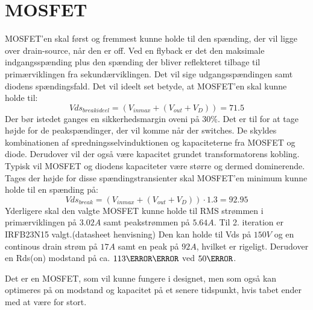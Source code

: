 \section{MOSFET}
MOSFET'en skal først og fremmest kunne holde til den spænding, der vil ligge over drain-source, når den er off. Ved en flyback er det den maksimale indgangsspænding plus den spænding der bliver reflekteret tilbage til primærviklingen fra sekundærviklingen. Det vil sige udgangsspændingen samt diodens spændingsfald. Det vil ideelt set betyde, at MOSFET'en skal kunne holde til:
\begin{equation} \label{Vds_breakideel}
Vds_{breakideel} = (V_{inmax}+(V_{out}+V_D))= 71.5
\end{equation}
Der bør istedet ganges en sikkerhedsmargin oveni på $30\percent$. Det er til for at tage højde for de peakspændinger, der vil komme når der switches. De skyldes kombinationen af spredningsselvinduktionen og kapaciteterne fra MOSFET og diode. Derudover vil der også være kapacitet grundet transformatorens kobling. Typisk vil MOSFET og diodens kapaciteter være større og dermed dominerende. Tages der højde for disse spændingstransienter skal MOSFET'en minimum kunne holde til en spænding på: 
\begin{equation} \label{Vds_break}
Vds_{break} = (V_{inmax}+(V_{out}+V_D)) \cdot 1.3 = 92.95
\end{equation}
Yderligere skal den valgte MOSFET kunne holde til RMS strømmen i primærviklingen på $3.02A$ samt peakstrømmen på $5.64A$.
Til 2. iteration er IRFB23N15 valgt.(datasheet henvisning) Den kan holde til Vds på $150V$ og en continous drain strøm på $17A$ samt en peak på $92A$, hvilket er rigeligt. Derudover en Rds(on) modstand på ca. $113\milli \ohm$ ved $50\degreeCelsius$. 

Det er en MOSFET, som vil kunne fungere i designet, men som også kan optimeres på on modstand og kapacitet på et senere tidspunkt, hvis tabet ender med at være for stort. 

